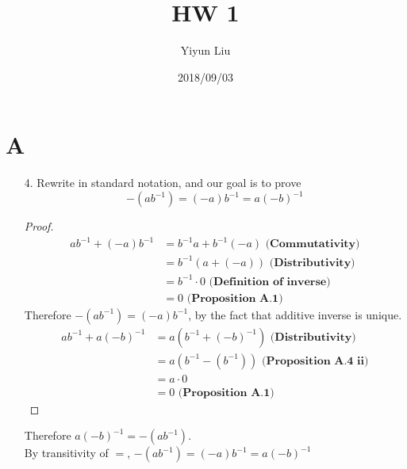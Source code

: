 \documentclass{article}
\title{HW 1}
\date{2018/09/03}
\author{Yiyun Liu}
\begin{document}
\maketitle
\lstset{basicstyle=\ttfamily}

\section*{A}
\begin{itemize}
\item [4.] Rewrite in standard notation, and our goal is to prove
  \[-(ab^{-1})=(-a)b^{-1}=a(-b)^{-1}\]
  \begin{proof}
    \begin{equation*}
      \begin{split}
        ab^{-1}+(-a)b^{-1}
        &= b^{-1}a + b^{-1}(-a) \textbf{ (Commutativity)} \\
        &= b^{-1}(a+(-a)) \textbf{ (Distributivity)}\\
        &= b^{-1}\cdot 0 \textbf{ (Definition of inverse)}\\
        &= 0 \textbf{ (Proposition A.1)}
      \end{split}
    \end{equation*}
    Therefore $-(ab^{-1})=(-a)b^{-1}$, by the fact that additive
    inverse is unique.\\
    \begin{equation*}
      \begin{split}
        ab^{-1}+a(-b)^{-1}
        &= a(b^{-1}+(-b)^{-1}) \textbf{ (Distributivity)}\\
        &= a(b^{-1} -(b^{-1})) \textbf{ (Proposition A.4 ii)}\\
        &= a\cdot 0\\
        &= 0 \textbf{ (Proposition A.1)}
      \end{split}
    \end{equation*}
  \end{proof}
  Therefore $a(-b)^{-1}=-(ab^{-1})$.\\
  By transitivity of $=$, \(-(ab^{-1})=(-a)b^{-1}=a(-b)^{-1}\)
\end{itemize}
\end{document}
